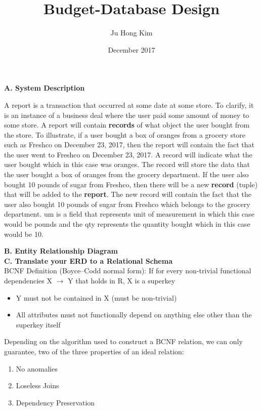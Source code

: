 \documentclass{article}
\title{Budget-Database Design}
\author{Ju Hong Kim }
\date{December 2017}
\begin{document}
\maketitle

\textbf{A. System Description}

A report is a transaction that occurred at some date at some store. To clarify, it is an instance of a business deal where the user paid some amount of money to some store. A report will contain \textbf{records} of what object the user bought from the store. To illustrate, if a user bought a box of oranges from a grocery store such as Freshco on December 23, 2017, then the report will contain the fact that the user went to Freshco on December 23, 2017. A record will indicate what the user bought which in this case was oranges. The record will store the data that the user bought a box of oranges from the grocery department. If the user also bought 10 pounds of sugar from Freshco, then there will be a new \textbf{record} (tuple) that will be added to the \textbf{report}. The new record will contain the fact that the user also bought 10 pounds of sugar from Freshco which belongs to the grocery department. um is a field that represents unit of measurement in which this case would be pounds and the qty represents the quantity bought which in this case would be 10.

\textbf{B. Entity Relationship Diagram}
\\


\textbf{C. Translate your ERD to a Relational Schema}
\\

BCNF Definition (Boyce–Codd normal form): If for every non-trivial functional dependencies X $\to$ Y that holds in R, X is a superkey

\begin{itemize}
    \item Y must not be contained in X (must be non-trivial)
    \item All attributes must not functionally depend on anything else other than the superkey itself
\end{itemize}


Depending on the algorithm used to construct a BCNF relation, we can only guarantee, two of the three properties of an ideal relation:

\begin{enumerate}
    \item No anomalies 
    \item Loseless Joins
    \item Dependency Preservation
\end{enumerate}
\end{document}
